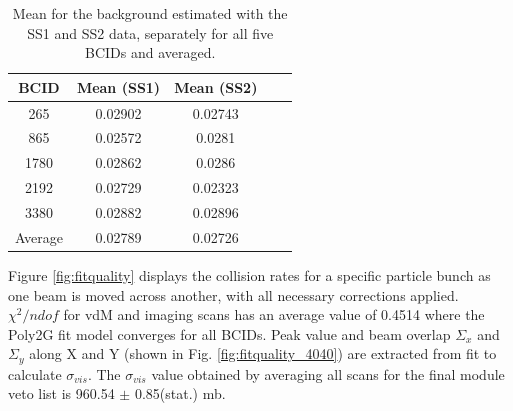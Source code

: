 \begin{table}
  \begin{center}
    \caption[2018 PCC background]{Mean for the background estimated with the SS1 and SS2 data, separately for all five BCIDs and averaged.}
    \begin{tabular}{ccccc}
    \textbf{BCID}   & \textbf{Mean (SS1)} & \textbf{Mean (SS2)} \\ \hline
      265     &  0.02902    &  0.02743    \\
        865  &    0.02572  &     0.0281  \\
       1780    &  0.02862   &     0.0286  \\
       2192   &  0.02729  &     0.02323  \\
       3380  &  0.02882  &    0.02896   \\
       Average & 0.02789 & 0.02726  \\
      \end{tabular}
    \label{tab:vdm:SS1_SS2}
  \end{center}
\end{table}

Figure \ref{fig:fitquality} displays the collision rates for a specific particle bunch as one beam is moved across another, with all necessary corrections applied. $\chi^2/ndof$ for vdM and imaging scans has an average value of 0.4514 where the Poly2G fit model converges for all BCIDs. Peak value and beam overlap $\Sigma_x$ and $\Sigma_y$ along X and Y (shown in Fig. \ref{fig:fitquality_4040}) are extracted from fit to calculate $\sigma_{vis}$. %
The $\sigma_{vis}$ value obtained by averaging all scans for the final module veto list is 960.54 $\pm$ 0.85(stat.) mb.

